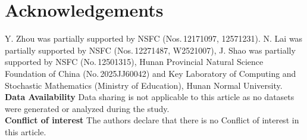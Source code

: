 \documentclass[11pt,letterpaper,reqno]{amsart}
\numberwithin{equation}{section}
\theoremstyle{definition}
\theoremstyle{remark}
\begin{document}
\makeatletter
{\renewcommand{\addcontentsline}[3]{}
\section*{Acknowledgements}} %
\makeatother
  Y. Zhou was partially supported by NSFC
(Nos.\,12171097, 12571231). N. Lai  was partially supported by NSFC
(Nos.\,12271487, W2521007),	
J. Shao  was partially supported by NSFC
(No.\,12501315), Hunan Provincial Natural Science Foundation of China (No.\,2025JJ60042) and Key Laboratory of Computing and Stochastic Mathematics (Ministry of Education), Hunan Normal University.\vspace{0.3cm}\\
 \textbf{Data Availability } Data sharing is not applicable to this article as no datasets were generated or analyzed
during the study.
\vspace{0.1cm}\\
\textbf{Conflict of interest } The authors declare that there is no Conflict of interest in this article.
\vspace{0.6cm}

\end{document}
